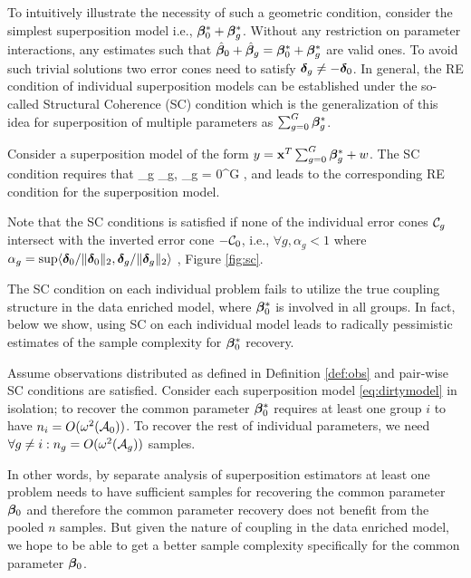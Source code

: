To intuitively illustrate the necessity of such a geometric condition, consider the simplest superposition model i.e., $\boldsymbol{\beta}^*_0 + \boldsymbol{\beta}^*_g$. Without any restriction on parameter interactions, any estimates such that $\hat{\boldsymbol{\beta}}_0 + \hat{\boldsymbol{\beta}}_g = \boldsymbol{\beta}^*_0 + \boldsymbol{\beta}^*_g$ are valid ones. To avoid such trivial solutions two error cones need to satisfy $\boldsymbol{\delta}_g \neq -\boldsymbol{\delta}_0$. In general, the RE condition of individual superposition models can be established under the so-called Structural Coherence (SC) condition \cite{guba16, mctr13} which is the generalization of this idea for superposition of multiple parameters as $\sum_{g = 0}^{G} \boldsymbol{\beta}^*_g$.
 
\begin{definition} \label{scc}
	Consider a superposition model of the form $y = \mathbf{x}^T \sum_{g = 0}^{G} \boldsymbol{\beta}^*_g + w$. The SC condition requires that
	\be 
	\forall \ddelta_g \in \cC_g, \exists \lambda \quad  {}  \quad {} \geq  \lambda \sum_{g = 0}^{G}  ,
	\ee  
	and leads to the corresponding RE condition for the superposition model.
\end{definition}

\begin{remark}
	Note that the SC conditions is satisfied if none of the individual error cones $\cC_g$ intersect with the inverted error cone $-\cC_0$, i.e., $\forall g, \alpha_g < 1$ where $\alpha_g = \sup \langle \boldsymbol{\delta}_0/\|\boldsymbol{\delta}_0\|_{2}, \boldsymbol{\delta}_g/\|\boldsymbol{\delta}_g\|_{2} \rangle$ \cite{guba16, trop15}, Figure \ref{fig:sc}. 
\end{remark}

The SC condition on each individual problem fails to utilize the true coupling structure in the data enriched model, where $\boldsymbol{\beta}^*_0$ is involved in all groups. In fact, below we show, using SC on each individual model leads to radically pessimistic estimates of the sample complexity for $\boldsymbol{\beta}^*_0$ recovery.
\begin{prop}
	\label{prop:super}
	Assume observations distributed as defined in Definition \ref{def:obs} and pair-wise SC conditions are satisfied.  Consider each superposition model \eqref{eq:dirtymodel} in isolation; to recover the common parameter $\boldsymbol{\beta} _0^*$ requires at least one group $i$ to have $n_i = O(\omega^2(\cA_0))$. 
	To recover the rest of individual parameters, we need $\forall g \neq i: n_g = O(\omega^2(\cA_g))$ samples. 
\end{prop}
In other words, by separate analysis of superposition estimators at least one problem needs to have sufficient samples for recovering the common parameter $\boldsymbol{\beta}_0$ and therefore the common parameter recovery does not benefit from the pooled $n$ samples.
But given the nature of coupling in the data enriched model, we hope to be able to get a better sample complexity specifically for the common parameter $\boldsymbol{\beta}_0$.

